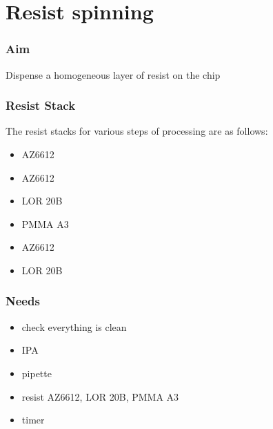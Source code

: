 \section{Resist spinning}

\subsubsection{Aim}
Dispense a homogeneous layer of resist on the chip

\subsubsection{Resist Stack}
The resist stacks for various steps of processing are as follows:
\begin{description}[noitemsep, nolistsep, leftmargin=\parindent, labelindent=\parindent]
\item[Mesa Etch] \hfill
  \begin{itemize} [noitemsep, nolistsep]
    \item AZ6612
  \end{itemize}
\item[Ohmics] \hfill
  \begin{itemize} [noitemsep, nolistsep]
    \item AZ6612
    \item LOR 20B
  \end{itemize}
\item[Fine Gates] \hfill
  \begin{itemize} [noitemsep, nolistsep]
    \item PMMA A3
  \end{itemize}
\item[Optical Gates] \hfill
  \begin{itemize} [noitemsep, nolistsep]
    \item AZ6612
    \item LOR 20B
  \end{itemize}
\end{description}

\subsubsection{Needs}
\begin{itemize} [noitemsep]
\item check everything is clean
\item IPA
\item pipette
\item resist AZ6612, LOR 20B, PMMA A3
\item timer
\end{itemize}

